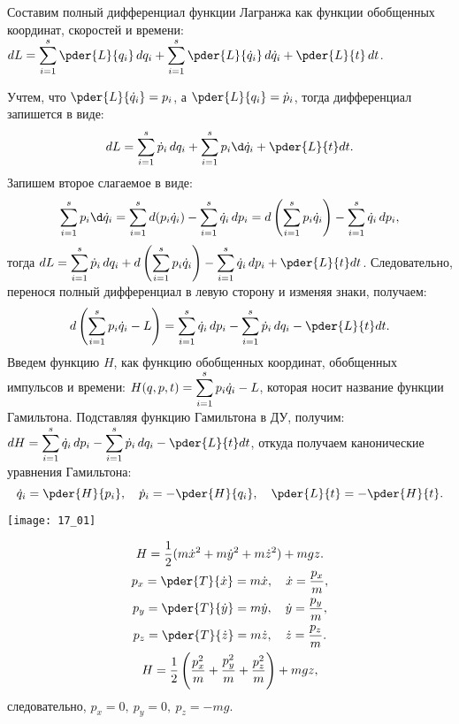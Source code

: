 
Составим полный дифференциал функции Лагранжа как функции обобщенных координат,
скоростей и времени:
\( \ds dL = \sum_{i=1}^s \pder{L}{q_i}\,dq_i + \sum_{i=1}^s \pder{L}{\dot{q}_i}
\,d\dot{q}_i + \pder{L}{t}\,dt \).

Учтем, что \( \ds \pder{L}{\dot{q}_i} = p_i \), а \( \ds \pder{L}{q_i} =
\dot{p}_i \), тогда дифференциал запишется в виде:
\[
    dL = \sum_{i=1}^s \dot{p}_i\,dq_i + \sum_{i=1}^s p_i\d\dot{q}_i +
    \pder{L}{t}dt.
\]
Запишем второе слагаемое в виде:
\[
    \sum_{i=1}^s p_i\d\dot{q}_i = \sum_{i=1}^s d(p_i\dot{q}_i) - \sum_{i=1}^s
    \dot{q}_i\,dp_i = d\left(\sum_{i=1}^s p_i\dot{q}_i\right) - \sum_{i=1}^s
    \dot{q}_i\,dp_i,
\]
тогда \( \ds dL = \sum_{i=1}^s \dot{p}_i\,dq_i + d\left(\sum_{i=1}^s
p_i\dot{q}_i\right) - \sum_{i=1}^s\dot{q}_i\,dp_i + \pder{L}{t}dt \).
Следовательно, перенося полный дифференциал в левую сторону и изменяя знаки,
получаем:
\[
    d\left(\sum_{i=1}^s p_i\dot{q}_i - L\right) = \sum_{i=1}^s\dot{q}_i\,dp_i -
    \sum_{i=1}^s \dot{p}_i\,dq_i - \pder{L}{t}dt.
\]
Введем функцию \( H \), как функцию обобщенных координат, обобщенных импульсов и времени:
\( \displaystyle H(q, p, t) = \sum_{i=1}^s p_i\dot{q}_i - L \), которая носит название
функции Гамильтона. Подставляя функцию Гамильтона в ДУ, получим: \( \ds dH =
\sum_{i=1}^s\dot{q}_i\,dp_i - \sum_{i=1}^s \dot{p}_i\,dq_i - \pder{L}{t}dt \),
откуда получаем канонические уравнения Гамильтона:
\[
    \dot{q}_i = \pder{H}{p_i}, \quad \dot{p}_i = -\pder{H}{q_i}, \quad
    \pder{L}{t} = -\pder{H}{t}.
\]

\begin{minipage}{.4\textwidth}
    \texttt{[image: 17\_01]}
\end{minipage} \hfill
\begin{minipage}{.55\textwidth}
    \begin{gather*}
        H = \frac{1}{2}(m\dot{x}^2 + m\dot{y}^2 + m\dot{z}^2) + mgz. \\
        p_x = \pder{T}{\dot{x}} = m\dot{x}, \quad \dot{x} = \frac{p_x}{m}, \\
        p_y = \pder{T}{\dot{y}} = m\dot{y}, \quad \dot{y} = \frac{p_y}{m}, \\
        p_z = \pder{T}{\dot{z}} = m\dot{z}, \quad \dot{z} = \frac{p_z}{m}. \\
        H = \frac{1}{2}\left( \frac{p_x^2}{m} + \frac{p_y^2}{m} +
        \frac{p_z^2}{m} \right) + mgz,
    \end{gather*}
    следовательно, \( p_x = 0,\ p_y = 0,\ p_z = -mg \).
\end{minipage}

\newpage
